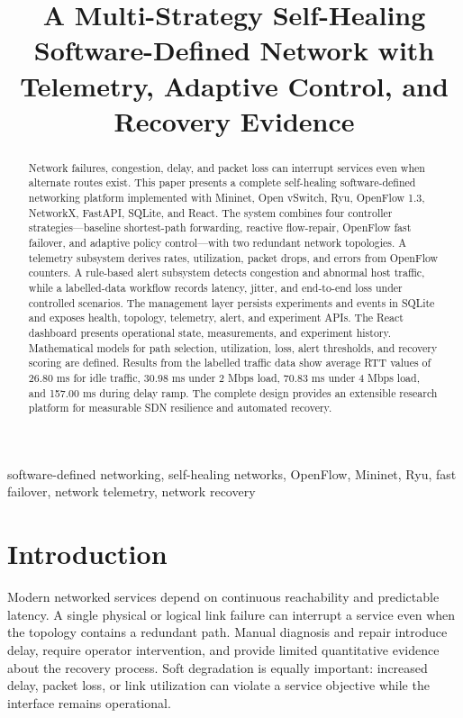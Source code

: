 \documentclass[conference]{IEEEtran}
\title{A Multi-Strategy Self-Healing Software-Defined Network with Telemetry, Adaptive Control, and Recovery Evidence}
\author{\IEEEauthorblockN{Student Research Project}
\IEEEauthorblockA{Department of Computer Science\\
SDN and Network Automation Laboratory}}
\begin{document}
\maketitle

\begin{abstract}
Network failures, congestion, delay, and packet loss can interrupt services
even when alternate routes exist. This paper presents a complete self-healing
software-defined networking platform implemented with Mininet, Open vSwitch,
Ryu, OpenFlow 1.3, NetworkX, FastAPI, SQLite, and React. The system combines
four controller strategies---baseline shortest-path forwarding, reactive
flow-repair, OpenFlow fast failover, and adaptive policy control---with two
redundant network topologies. A telemetry subsystem derives rates,
utilization, packet drops, and errors from OpenFlow counters. A rule-based
alert subsystem detects congestion and abnormal host traffic, while a
labelled-data workflow records latency, jitter, and end-to-end loss under
controlled scenarios. The management layer persists experiments and events in
SQLite and exposes health, topology, telemetry, alert, and experiment APIs.
The React dashboard presents operational state, measurements, and experiment
history. Mathematical models for path selection, utilization, loss, alert
thresholds, and recovery scoring are defined. Results from the labelled
traffic data show average RTT values of 26.80 ms for idle traffic, 30.98 ms
under 2 Mbps load, 70.83 ms under 4 Mbps load, and 157.00 ms during delay
ramp. The complete design provides an extensible research platform for
measurable SDN resilience and automated recovery.
\end{abstract}

\begin{IEEEkeywords}
software-defined networking, self-healing networks, OpenFlow, Mininet, Ryu,
fast failover, network telemetry, network recovery
\end{IEEEkeywords}

\section{Introduction}
\label{sec:introduction}

Modern networked services depend on continuous reachability and predictable
latency. A single physical or logical link failure can interrupt a service even
when the topology contains a redundant path. Manual diagnosis and repair
introduce delay, require operator intervention, and provide limited quantitative
evidence about the recovery process. Soft degradation is equally important:
increased delay, packet loss, or link utilization can violate a service
objective while the interface remains operational.
\end{document}
